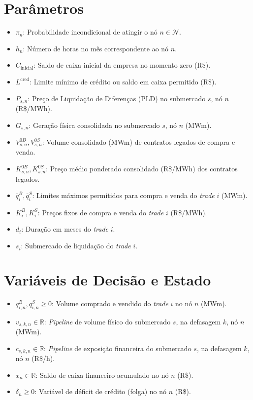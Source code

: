 \documentclass[12pt, a4paper]{article}
\begin{document}
\section{Parâmetros}
\begin{itemize}
    \item $\pi_n$: Probabilidade incondicional de atingir o nó $n \in \mathcal{N}$.
    \item $h_n$: Número de horas no mês correspondente ao nó $n$.
    \item $C_{\text{inicial}}$: Saldo de caixa inicial da empresa no momento zero (R\$).
    \item $L^{\text{cred}}$: Limite mínimo de crédito ou saldo em caixa permitido (R\$).
    \item $P_{s,n}$: Preço de Liquidação de Diferenças (PLD) no submercado $s$, nó $n$ (R\$/MWh).
    \item $G_{s,n}$: Geração física consolidada no submercado $s$, nó $n$ (MWm).
    \item $V_{s,n}^{0B}, V_{s,n}^{0S}$: Volume consolidado (MWm) de contratos legados de compra e venda.
    \item $K_{s,n}^{0B}, K_{s,n}^{0S}$: Preço médio ponderado consolidado (R\$/MWh) dos contratos legados.
    \item $\bar{q}_i^B, \bar{q}_i^S$: Limites máximos permitidos para compra e venda do \textit{trade} $i$ (MWm).
    \item $K_i^B, K_i^S$: Preços fixos de compra e venda do \textit{trade} $i$ (R\$/MWh).
    \item $d_i$: Duração em meses do \textit{trade} $i$.
    \item $s_i$: Submercado de liquidação do \textit{trade} $i$.
\end{itemize}

\section{Variáveis de Decisão e Estado}
\begin{itemize}
    \item $q_{i,n}^B, q_{i,n}^S \ge 0$: Volume comprado e vendido do \textit{trade} $i$ no nó $n$ (MWm).
    \item $v_{s,k,n} \in \mathbb{R}$: \textit{Pipeline} de volume físico do submercado $s$, na defasagem $k$, nó $n$ (MWm).
    \item $c_{s,k,n} \in \mathbb{R}$: \textit{Pipeline} de exposição financeira do submercado $s$, na defasagem $k$, nó $n$ (R\$/h).
    \item $x_n \in \mathbb{R}$: Saldo de caixa financeiro acumulado no nó $n$ (R\$).
    \item $\delta_n \ge 0$: Variável de déficit de crédito (folga) no nó $n$ (R\$).
\end{itemize}
\end{document}

